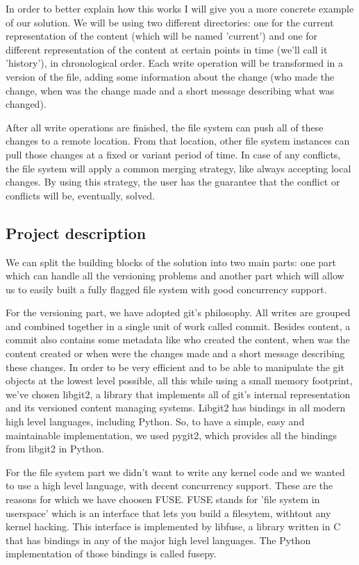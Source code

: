 In order to better explain how this works I will give you a more concrete example of our solution. We will be using two different directories: one for the current representation of the content (which will be named 'current') and one for different representation of the content at certain points in time (we'll call it 'history'), in chronological order. Each write operation will be transformed in a version of the file, adding some information about the change (who made the change, when was the change made and a short message describing what was changed).

After all write operations are finished, the file system can push all of these changes to a remote location. From that location, other file system instances can pull those changes at a fixed or variant period of time. In case of any conflicts, the file system will apply a common merging strategy, like always accepting local changes. By using this strategy, the user has the guarantee that the conflict or conflicts will be, eventually, solved.

\subsection{Project description}
We can split the building blocks of the solution into two main parts: one part which can handle all the versioning problems and another part which will allow us to easily built a fully flagged file system with good concurrency support.

For the versioning part, we have adopted git's philosophy. All writes are grouped and combined together in a single unit of work called commit. Besides content, a commit also contains some metadata like who created the content, when was the content created or when were the changes made and a short message describing these changes. In order to be very efficient and to be able to manipulate the git objects at the lowest level possible, all this while using a small memory footprint, we've chosen libgit2, a library that implements all of git's internal representation and its versioned content managing systems. Libgit2 has bindings in all modern high level languages, including Python. So, to have a simple, easy and maintainable implementation, we used pygit2, which provides all the bindings from libgit2 in Python.

For the file system part we didn't want to write any kernel code and we wanted to use a high level language, with decent concurrency support. These are the reasons for which we have choosen FUSE. FUSE stands for 'file system in userspace' which is an interface that lets you build a filesytem, withtout any kernel hacking. This interface is implemented by libfuse, a library written in C that has bindings in any of the major high level languages. The Python implementation of those bindings is called fusepy.

